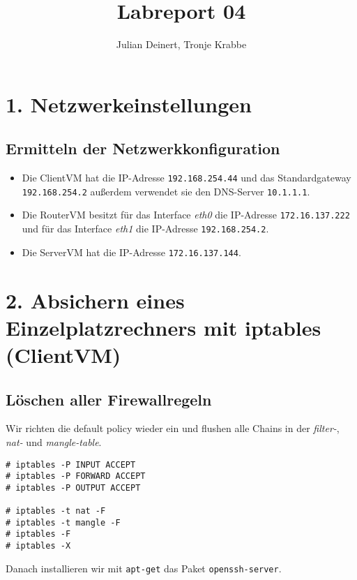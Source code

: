 \documentclass[10pt,a4paper]{article}
\author{Julian Deinert, Tronje Krabbe}
\title{Labreport 04}
\begin{document}
\maketitle
\tableofcontents
\newpage


\section*{1. Netzwerkeinstellungen }
\setcounter{subsection}{1}

\subsection{Ermitteln der Netzwerkkonfiguration}
\begin{itemize}
\item Die ClientVM hat die IP-Adresse \texttt{192.168.254.44} und das Standardgateway \texttt{192.168.254.2} außerdem verwendet sie den DNS-Server \texttt{10.1.1.1}.

\item Die RouterVM besitzt für das Interface \textit{eth0} die IP-Adresse \texttt{172.16.137.222} und für das Interface \textit{eth1} die IP-Adresse \texttt{192.168.254.2}.

\item Die ServerVM hat die IP-Adresse \texttt{172.16.137.144}.
\end{itemize}

\setcounter{section}{2}
\section*{2. Absichern eines Einzelplatzrechners mit iptables (ClientVM)}
\setcounter{subsection}{0}
\subsection{Löschen aller Firewallregeln}

Wir richten die default policy wieder ein und flushen alle Chains  in der \textit{filter-}, \textit{nat-} und \textit{mangle-table}.
\begin{verbatim}
# iptables -P INPUT ACCEPT
# iptables -P FORWARD ACCEPT
# iptables -P OUTPUT ACCEPT

# iptables -t nat -F
# iptables -t mangle -F
# iptables -F
# iptables -X
\end{verbatim}
Danach installieren wir mit \texttt{apt-get} das Paket \texttt{openssh-server}.
\end{document}
